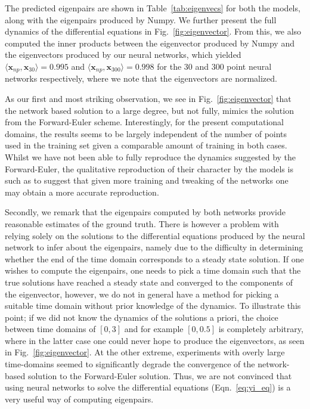\documentclass[reprint, english, nofootinbib]{revtex4-2}
\begin{document}
The predicted eigenpairs are shown in Table~\ref{tab:eigenvecs} for both the models, along with the eigenpairs produced by Numpy. We further present the full dynamics of the differential equations in Fig.~\ref{fig:eigenvector}. From this, we also computed the inner products between the eigenvector produced by Numpy and the eigenvectors produced by our neural networks, which yielded $\langle \pmb x_{np}, \pmb x_{30}\rangle = 0.995$ and $\langle \pmb x_{np}, \pmb x_{300}\rangle = 0.998$ for the 30 and 300 point neural networks respectively, where we note that the eigenvectors are normalized.

As our first and most striking observation, we see in Fig.~\ref{fig:eigenvector} that the network based solution to a large degree, but not fully, mimics the solution from the Forward-Euler scheme. Interestingly, for the present computational domains, the results seems to be largely independent of the number of points used in the training set given a comparable amount of training in both cases. Whilst we have not been able to fully reproduce the dynamics suggested by the Forward-Euler, the qualitative reproduction of their character by the models is such as to suggest that given more training and tweaking of the networks one may obtain a more accurate reproduction.

Secondly, we remark that the eigenpairs computed by both networks provide reasonable estimates of the ground truth. There is however a problem with relying solely on the solutions to the differential equations produced by the neural network to infer about the eigenpairs, namely due to the difficulty in determining whether the end of the time domain corresponds to a steady state solution. If one wishes to compute the eigenpairs, one needs to pick a time domain such that the true solutions have reached a steady state and converged to the components of the eigenvector, however, we do not in general have a method for picking a suitable time domain without prior knowledge of the dynamics. To illustrate this point; if we did not know the dynamics of the solutions a priori, the choice between time domains of $[0,3]$ and for example $[0,0.5]$ is completely arbitrary, where in the latter case one could never hope to produce the eigenvectors, as seen in Fig.~\ref{fig:eigenvector}. At the other extreme, experiments with overly large time-domains seemed to significantly degrade the convergence of the network-based solution to the Forward-Euler solution. Thus, we are not convinced that using neural networks to solve the differential equations (Eqn.~\ref{eq:yi_eq}) is a very useful way of computing eigenpairs.
\end{document}
